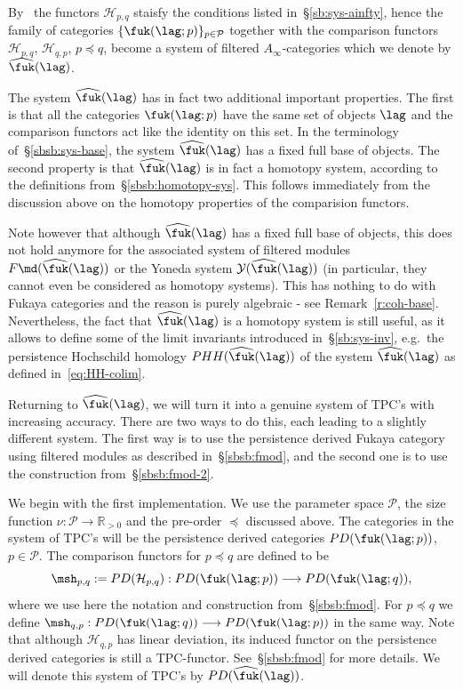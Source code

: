 By~\cite{Amb:fil-fuk} the functors $\mathcal{H}_{p,q}$ staisfy the
conditions listed in~\S\ref{sb:sys-ainfty}, hence the family of
categories $\{\fuk(\lag;p)\}_{p \in \mathcal{P}}$ together with the
comparison functors $\mathcal{H}_{p,q}$, $\mathcal{H}_{q,p}$,
$p \preceq q$, become a system of filtered $A_{\infty}$-categories
which we denote by $\widehat{\fuk}(\lag)$.

The system $\widehat{\fuk}(\lag)$ has in fact two additional important
properties. The first is that all the categories $\fuk(\lag;p)$ have
the same set of objects $\lag$ and the comparison functors act like
the identity on this set. In the terminology of~\S\ref{sbsb:sys-base},
the system $\widehat{\fuk}(\lag)$ has a fixed full base of objects.
The second property is that $\widehat{\fuk}(\lag)$ is in fact a
homotopy system, according to the definitions
from~\S\ref{sbsb:homotopy-sys}. This follows immediately from the
discussion above on the homotopy properties of the comparision
functors.

Note however that although $\widehat{\fuk}(\lag)$ has a fixed full
base of objects, this does not hold anymore for the associated system
of filtered modules $F\md(\widehat{\fuk}(\lag))$ or the Yoneda system
$\mathcal{Y}(\widehat{\fuk}(\lag))$ (in particular, they cannot even
be considered as homotopy systems). This has nothing to do with Fukaya
categories and the reason is purely algebraic - see
Remark~\ref{r:coh-base}. Nevertheless, the fact that
$\widehat{\fuk}(\lag)$ is a homotopy system is still useful, as it
allows to define some of the limit invariants introduced
in~\S\ref{sb:sys-inv}, e.g.~the persistence Hochschild homology
$PHH(\widehat{\fuk}(\lag))$ of the system $\widehat{\fuk}(\lag)$ as
defined in~\eqref{eq:HH-colim}.

Returning to $\widehat{\fuk}(\lag)$, we will turn it into a genuine
system of TPC's with increasing accuracy. There are two ways to do
this, each leading to a slightly different system. The first way is to
use the persistence derived Fukaya category using filtered
modules as described in~\S\ref{sbsb:fmod}, and the second one is to
use the construction from~\S\ref{sbsb:fmod-2}.

We begin with the first implementation. We use the parameter space
$\mathcal{P}$, the size function
$\nu: \mathcal{P} \longrightarrow \mathbb{R}_{>0}$ and the pre-order
$\preceq$ discussed above. The categories in the system of TPC's will
be the persistence derived categories $PD(\fuk(\lag; p))$,
$p \in \mathcal{P}$. The comparison functors
for $p \preceq q$ are defined to be
$$\msh_{p,q} := PD (\mathcal{H}_{p,q}): PD(\fuk(\lag; p))
\longrightarrow PD(\fuk(\lag; q)),$$ where we use here the notation
and construction from~\S\ref{sbsb:fmod}. For $p \preceq q$ we define
$\msh_{q,p}: PD(\fuk(\lag; q)) \longrightarrow PD(\fuk(\lag;
p))$ in the same way. Note that although $\mathcal{H}_{q,p}$ has
linear deviation, its induced functor on the persistence derived
categories is still a TPC-functor. See~\S\ref{sbsb:fmod} for more
details. We will denote this system of TPC's by
$PD(\widehat{\fuk}(\lag))$.

